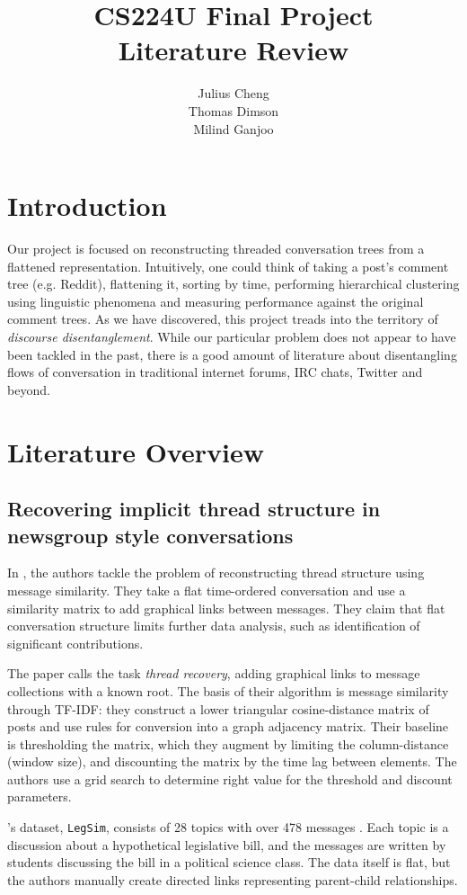 \documentclass{article}
\title{CS224U Final Project \\Literature Review}
\author{Julius Cheng\\ Thomas Dimson \\ Milind Ganjoo}
\begin{document}
\maketitle

\section{Introduction}
Our project is focused on reconstructing threaded conversation trees
from a flattened representation. Intuitively, one could think of 
taking a post's comment tree (e.g. Reddit), flattening it, sorting by time, performing
hierarchical clustering using linguistic phenomena and measuring performance 
against the original comment trees. As we have
discovered, this project treads into the territory of \textit{discourse disentanglement}.
While our particular problem does not appear to have been tackled in the past,
there is a good amount of literature about disentangling flows of conversation
in traditional internet forums, IRC chats, Twitter and beyond.

\section{Literature Overview}
\subsection{Recovering implicit thread structure in newsgroup style
conversations}
In \cite{Wang2008a}, the authors tackle the problem of reconstructing thread
structure using message similarity. They take a flat
time-ordered conversation and use a similarity matrix to add graphical
links between messages. They claim that flat conversation structure
limits further data analysis, such as identification of significant
contributions. 

The paper calls the task \textit{thread recovery},
adding graphical links to message collections with a known root.
The basis of their algorithm is message similarity through TF-IDF: they
construct a lower triangular cosine-distance matrix of posts and use rules 
for conversion into a graph adjacency matrix. Their baseline is thresholding the
matrix, which they augment by limiting the column-distance (window size), and discounting
the matrix by the time lag between elements. The authors use a grid search to
determine right value for the threshold and discount parameters.

\cite{Wang2008a}'s dataset, \texttt{LegSim}, consists of 28 topics with over 
478 messages . Each topic is a discussion about a hypothetical legislative bill, 
and the messages are written by students discussing the bill in a political science class. 
The data itself is flat, but  the authors manually create directed links representing
parent-child relationships. 
\end{document}
